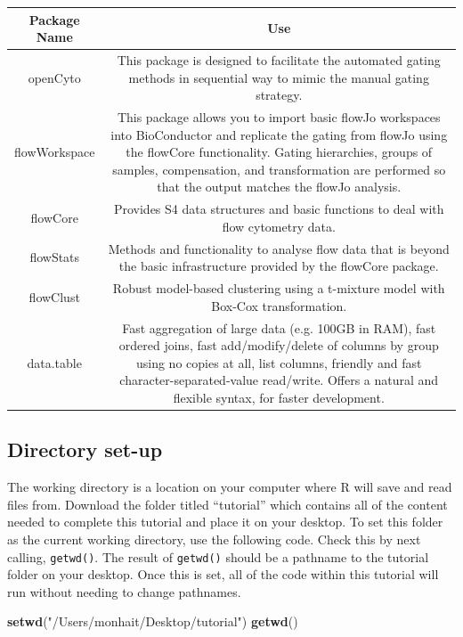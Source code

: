 \documentclass[]{book}
\newenvironment{Shaded}{\begin{snugshade}}{\end{snugshade}}
\newcommand{\KeywordTok}[1]{\textcolor[rgb]{0.13,0.29,0.53}{\textbf{#1}}}
\newcommand{\NormalTok}[1]{#1}
\newcommand{\StringTok}[1]{\textcolor[rgb]{0.31,0.60,0.02}{#1}}
\begin{document}
\begin{tabular}{c|c}
\hline
Package Name & Use\\
\hline
openCyto & This package is designed to facilitate the automated gating methods in sequential way to mimic the manual gating strategy.\\
\hline
flowWorkspace & This package allows you to import basic flowJo workspaces into BioConductor and replicate the gating from flowJo using the flowCore functionality. Gating hierarchies, groups of samples, compensation, and transformation are performed so that the output matches the flowJo analysis.\\
\hline
flowCore & Provides S4 data structures and basic functions to deal with flow cytometry data.\\
\hline
flowStats & Methods and functionality to analyse flow data that is beyond the basic infrastructure provided by the flowCore package.\\
\hline
flowClust & Robust model-based clustering using a t-mixture model with Box-Cox transformation.\\
\hline
data.table & Fast aggregation of large data (e.g. 100GB in RAM), fast ordered joins, fast add/modify/delete of columns by group using no copies at all, list columns, friendly and fast character-separated-value read/write. Offers a natural and flexible syntax, for faster development.\\
\hline
\end{tabular}

\hypertarget{directory-set-up}{%
\subsection{Directory set-up}\label{directory-set-up}}

The working directory is a location on your computer where R will save and read files from. Download the folder titled ``tutorial'' which contains all of the content needed to complete this tutorial and place it on your desktop. To set this folder as the current working directory, use the following code. Check this by next calling, \texttt{getwd()}. The result of \texttt{getwd()} should be a pathname to the tutorial folder on your desktop. Once this is set, all of the code within this tutorial will run without needing to change pathnames.

\begin{Shaded}
\begin{Highlighting}[]
\KeywordTok{setwd}\NormalTok{(}\StringTok{"/Users/monhait/Desktop/tutorial"}\NormalTok{)}
\KeywordTok{getwd}\NormalTok{()}
\end{Highlighting}
\end{Shaded}
\end{document}
